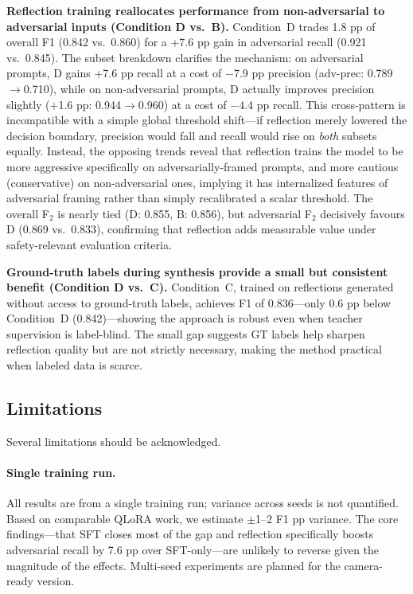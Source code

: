 \documentclass[11pt]{article}
\begin{document}
\textbf{Reflection training reallocates performance from non-adversarial to adversarial inputs (Condition D vs.\ B).}
Condition~D trades 1.8 pp of overall F1 (0.842 vs.\ 0.860) for a +7.6 pp gain in adversarial recall (0.921 vs.\ 0.845). The subset breakdown clarifies the mechanism: on adversarial prompts, D gains +7.6 pp recall at a cost of $-$7.9 pp precision (adv-prec: 0.789$\to$0.710), while on non-adversarial prompts, D actually improves precision slightly ($+$1.6 pp: 0.944$\to$0.960) at a cost of $-$4.4 pp recall. This cross-pattern is incompatible with a simple global threshold shift---if reflection merely lowered the decision boundary, precision would fall and recall would rise on \emph{both} subsets equally. Instead, the opposing trends reveal that reflection trains the model to be more aggressive specifically on adversarially-framed prompts, and more cautious (conservative) on non-adversarial ones, implying it has internalized features of adversarial framing rather than simply recalibrated a scalar threshold. The overall F$_2$ is nearly tied (D: 0.855, B: 0.856), but adversarial F$_2$ decisively favours D (0.869 vs.\ 0.833), confirming that reflection adds measurable value under safety-relevant evaluation criteria.

\textbf{Ground-truth labels during synthesis provide a small but consistent benefit (Condition D vs.\ C).}
Condition~C, trained on reflections generated without access to ground-truth labels, achieves F1 of 0.836---only 0.6 pp below Condition~D (0.842)---showing the approach is robust even when teacher supervision is label-blind. The small gap suggests GT labels help sharpen reflection quality but are not strictly necessary, making the method practical when labeled data is scarce.

\subsection{Limitations}

Several limitations should be acknowledged.

\paragraph{Single training run.}
All results are from a single training run; variance across seeds is not quantified. Based on comparable QLoRA work, we estimate $\pm$1--2 F1 pp variance. The core findings---that SFT closes most of the gap and reflection specifically boosts adversarial recall by 7.6 pp over SFT-only---are unlikely to reverse given the magnitude of the effects. Multi-seed experiments are planned for the camera-ready version.
\end{document}
